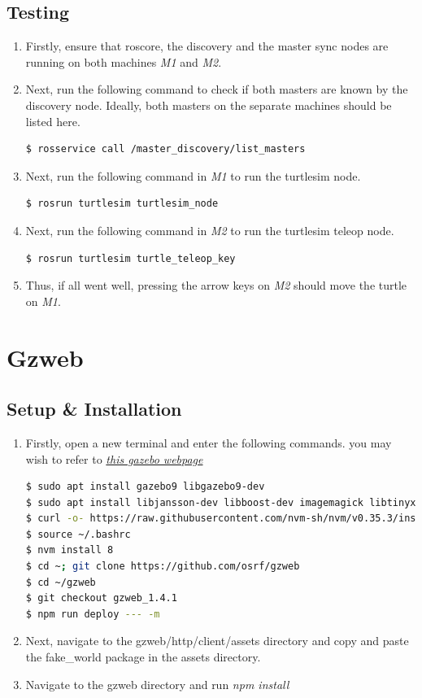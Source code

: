\documentclass[11pt]{article}
\begin{document}
\subsection{Testing}
\begin{enumerate}
 \item {
       Firstly, ensure that roscore, the discovery and the master sync nodes are running on both machines \emph{M1} and \emph{M2}.
       }
 \item{
       Next, run the following command to check if both masters are known by the discovery node.
       Ideally, both masters on the separate machines should be listed here.
       \begin{lstlisting}[language=bash]
         $ rosservice call /master_discovery/list_masters
        \end{lstlisting}
       }
 \item{
       Next, run the following command in \emph{M1} to run the turtlesim node.
       \begin{lstlisting}[language=bash]
          $ rosrun turtlesim turtlesim_node
        \end{lstlisting}
       }
 \item{
       Next, run the following command in \emph{M2} to run the turtlesim teleop node.
       \begin{lstlisting}[language=bash]
          $ rosrun turtlesim turtle_teleop_key
        \end{lstlisting}
       }
 \item{
       Thus, if all went well, pressing the arrow keys on \emph{M2} should move the turtle on \emph{M1}.
       }
\end{enumerate}
\section{Gzweb}
\subsection{Setup \& Installation}
\begin{enumerate}
 \item {
       Firstly, open a new terminal and enter the following commands.
       you may wish to refer to \href{https://classic.gazebosim.org/tutorials?tut=gzweb_install&cat=gzweb}{\emph{this gazebo webpage}}
       \begin{lstlisting}[language=bash]
$ sudo apt install gazebo9 libgazebo9-dev
$ sudo apt install libjansson-dev libboost-dev imagemagick libtinyxml-dev mercurial cmake build-essential
$ curl -o- https://raw.githubusercontent.com/nvm-sh/nvm/v0.35.3/install.sh | bash
$ source ~/.bashrc
$ nvm install 8
$ cd ~; git clone https://github.com/osrf/gzweb
$ cd ~/gzweb
$ git checkout gzweb_1.4.1
$ npm run deploy --- -m
       \end{lstlisting}
       }
 \item{
       Next, navigate to the
       gzweb/http/client/assets
       directory and copy and paste the fake\_world package in the assets directory.
       }
 \item { Navigate to the gzweb directory and run \emph{npm install}}
\end{enumerate}
\end{document}

